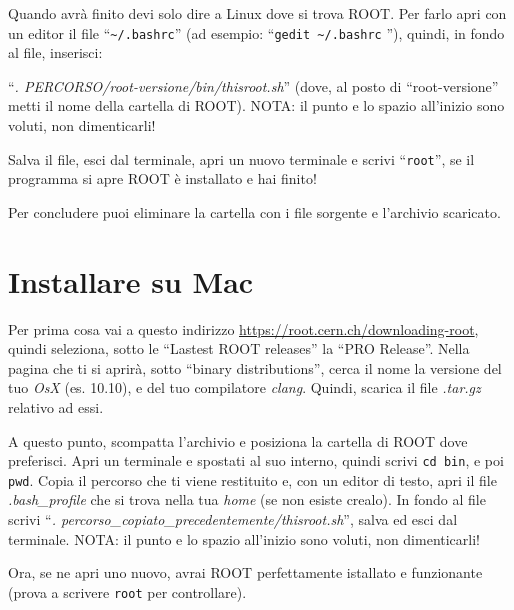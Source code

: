 Quando avrà finito devi solo dire a Linux dove si trova ROOT. Per farlo apri con un editor il file ``\verb|~/.bashrc|'' (ad esempio: ``\verb|gedit ~/.bashrc| ''), quindi, in fondo al file, inserisci:

``\emph{. PERCORSO/root-versione/bin/thisroot.sh}'' (dove, al posto di ``root-versione'' metti il nome della cartella di ROOT). NOTA: il punto e lo spazio all'inizio sono voluti, non dimenticarli!

Salva il file, esci dal terminale, apri un nuovo terminale e scrivi ``\verb|root|'', se il programma si apre ROOT è installato e hai finito!

Per concludere puoi eliminare la cartella con i file sorgente e l'archivio scaricato.
\section{Installare su Mac}\label{instmac}
Per prima cosa vai a questo indirizzo \url{https://root.cern.ch/downloading-root}, quindi seleziona, sotto le ``Lastest ROOT releases'' la ``PRO Release''. Nella pagina che ti si aprirà, sotto ``binary distributions'', cerca il nome la versione del tuo \emph{OsX} (es. 10.10), e del tuo compilatore \emph{clang}. Quindi, scarica il file \emph{.tar.gz} relativo ad essi. 

A questo punto, scompatta l'archivio e posiziona la cartella di ROOT dove preferisci. Apri un terminale e spostati al suo interno, quindi scrivi \verb|cd bin|, e poi \verb|pwd|. Copia il percorso che ti viene restituito e, con un editor di testo, apri il file \emph{.bash\_profile} che si trova nella tua \emph{home} (se non esiste crealo). In fondo al file scrivi ``\emph{. percorso\_copiato\_precedentemente/thisroot.sh}'', salva ed esci dal terminale.  NOTA: il punto e lo spazio all'inizio sono voluti, non dimenticarli!

Ora, se ne apri uno nuovo, avrai ROOT perfettamente istallato e funzionante (prova a scrivere \verb|root| per controllare).